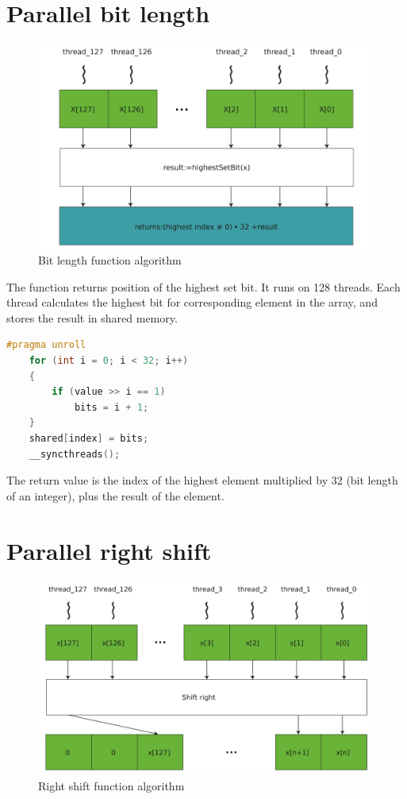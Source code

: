 \documentclass[oneside,openright,12pt,final,en]{mgr}
\begin{document}
\section{Parallel bit length}

\begin{figure}[H]
	\centering
	\includegraphics[width=\textwidth]{al_bitlength}
	\caption{Bit length function algorithm}
	\label{fig:al_bilength}
\end{figure}

The function returns position of the highest set bit. It runs on 128 threads. Each thread calculates the highest bit for corresponding element in the array, and stores the result in shared memory.


\begin{lstlisting}[language=cpp]
#pragma unroll
	for (int i = 0; i < 32; i++)
	{
		if (value >> i == 1)
			bits = i + 1;
	}
	shared[index] = bits;
	__syncthreads();
\end{lstlisting}

The return value is the index of the highest element multiplied by 32 (bit length of an integer), plus the result of the element.

\section{Parallel right shift}
\begin{figure}[H]
	\centering
	\includegraphics[width=\textwidth]{al_shiftright}
	\caption{Right shift function algorithm}
	\label{fig:al_shiftright}
\end{figure}
\end{document}
